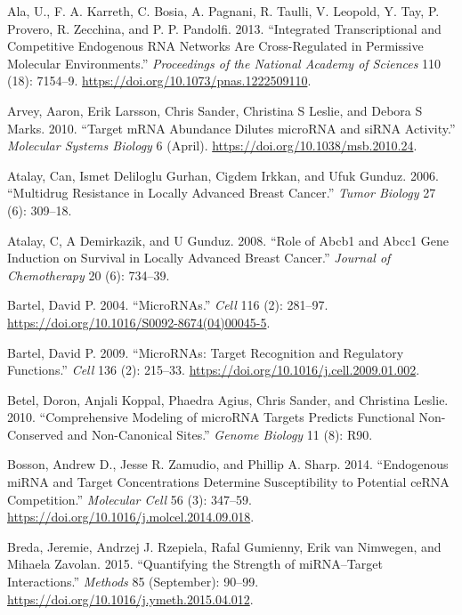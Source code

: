\documentclass[]{article}
\begin{document}
\hypertarget{refs}{}
\leavevmode\hypertarget{ref-ala_integrated_2013}{}%
Ala, U., F. A. Karreth, C. Bosia, A. Pagnani, R. Taulli, V. Leopold, Y.
Tay, P. Provero, R. Zecchina, and P. P. Pandolfi. 2013. ``Integrated
Transcriptional and Competitive Endogenous RNA Networks Are
Cross-Regulated in Permissive Molecular Environments.''
\emph{Proceedings of the National Academy of Sciences} 110 (18):
7154--9. \url{https://doi.org/10.1073/pnas.1222509110}.

\leavevmode\hypertarget{ref-arvey_target_2010}{}%
Arvey, Aaron, Erik Larsson, Chris Sander, Christina S Leslie, and Debora
S Marks. 2010. ``Target mRNA Abundance Dilutes microRNA and siRNA
Activity.'' \emph{Molecular Systems Biology} 6 (April).
\url{https://doi.org/10.1038/msb.2010.24}.

\leavevmode\hypertarget{ref-atalay2006multidrug}{}%
Atalay, Can, Ismet Deliloglu Gurhan, Cigdem Irkkan, and Ufuk Gunduz.
2006. ``Multidrug Resistance in Locally Advanced Breast Cancer.''
\emph{Tumor Biology} 27 (6): 309--18.

\leavevmode\hypertarget{ref-atalay2008role}{}%
Atalay, C, A Demirkazik, and U Gunduz. 2008. ``Role of Abcb1 and Abcc1
Gene Induction on Survival in Locally Advanced Breast Cancer.''
\emph{Journal of Chemotherapy} 20 (6): 734--39.

\leavevmode\hypertarget{ref-bartel_micrornas_2004}{}%
Bartel, David P. 2004. ``MicroRNAs.'' \emph{Cell} 116 (2): 281--97.
\url{https://doi.org/10.1016/S0092-8674(04)00045-5}.

\leavevmode\hypertarget{ref-bartel_micrornas:_2009}{}%
Bartel, David P. 2009. ``MicroRNAs: Target Recognition and Regulatory
Functions.'' \emph{Cell} 136 (2): 215--33.
\url{https://doi.org/10.1016/j.cell.2009.01.002}.

\leavevmode\hypertarget{ref-betel2010comprehensive}{}%
Betel, Doron, Anjali Koppal, Phaedra Agius, Chris Sander, and Christina
Leslie. 2010. ``Comprehensive Modeling of microRNA Targets Predicts
Functional Non-Conserved and Non-Canonical Sites.'' \emph{Genome
Biology} 11 (8): R90.

\leavevmode\hypertarget{ref-bosson_endogenous_2014}{}%
Bosson, Andrew D., Jesse R. Zamudio, and Phillip A. Sharp. 2014.
``Endogenous miRNA and Target Concentrations Determine Susceptibility to
Potential ceRNA Competition.'' \emph{Molecular Cell} 56 (3): 347--59.
\url{https://doi.org/10.1016/j.molcel.2014.09.018}.

\leavevmode\hypertarget{ref-breda_quantifying_2015}{}%
Breda, Jeremie, Andrzej J. Rzepiela, Rafal Gumienny, Erik van Nimwegen,
and Mihaela Zavolan. 2015. ``Quantifying the Strength of miRNA--Target
Interactions.'' \emph{Methods} 85 (September): 90--99.
\url{https://doi.org/10.1016/j.ymeth.2015.04.012}.
\end{document}
